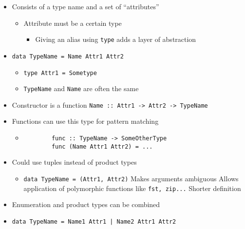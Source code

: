 \begin{itemize}
\begin{itemize}
            \item Consists of a type name and a set of ``attributes''
                \begin{itemize}
                    \item Attribute must be a certain type
                        \begin{itemize}
                            \item Giving an alias using \verb+type+ adds a layer of abstraction
                        \end{itemize}
                \end{itemize}
            \item \verb+data TypeName = Name Attr1 Attr2+
                \begin{itemize}
                    \item \verb+type Attr1 = Sometype+
                    \item \verb+TypeName+ and \verb+Name+ are often the same
                \end{itemize}
            \item Constructor is a function \verb+Name :: Attr1 -> Attr2 -> TypeName+
            \item Functions can use this type for pattern matching
                \begin{itemize}
                    \item
        \begin{verbatim}
        func :: TypeName -> SomeOtherType
        func (Name Attr1 Attr2) = ...
        \end{verbatim}
                \end{itemize}
            \item Could use tuples instead of product types
                \begin{itemize}
                    \item \verb+data TypeName = (Attr1, Attr2)+
                    \icon Makes arguments ambiguous
                    \ipro Allows application of polymorphic functions like \verb+fst, zip...+
                    \ipro Shorter definition
                \end{itemize}
        \end{itemize}
        \begin{itemize}
            \item Enumeration and product types can be combined
            \item \verb+data TypeName = Name1 Attr1 | Name2 Attr1 Attr2+

\end{itemize}
\end{itemize}
